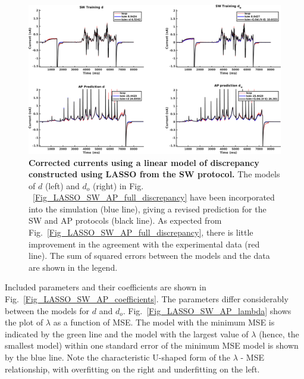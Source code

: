 \documentclass[11pt,a4paper,oneside]{article}
\begin{document}
\begin{figure}[hb]
\begin{center}
\includegraphics[scale=0.42]{Figures/LASSO_SW_AP_full_currents.png}
\caption{\textbf{Corrected currents using a linear model of discrepancy constructed using LASSO from the SW protocol.} The models of $d$ (left) and $d_o$ (right) in Fig. ~\ref{Fig_LASSO_SW_AP_full_discrepancy} have been incorporated into the simulation (blue line), giving a revised prediction for the SW and AP protocols (black line). As expected from Fig.~\ref{Fig_LASSO_SW_AP_full_discrepancy}, there is little improvement in the agreement with the experimental data (red line). The sum of squared errors between the models and the data are shown in the legend.}
\label{Fig_LASSO_SW_AP_full_currents}
\end{center}
\end{figure}

Included parameters and their coefficients are shown in Fig.~\ref{Fig_LASSO_SW_AP_coefficients}. The parameters differ considerably between the models for $d$ and $d_o$. Fig.~\ref{Fig_LASSO_SW_AP_lambda} shows the plot of $\lambda$ as a function of MSE. The model with the minimum MSE is indicated by the green line and the model with the largest value of $\lambda$ (hence, the smallest model) within one standard error of the minimum MSE model is shown by the blue line. Note the characteristic U-shaped form of the $\lambda$ - MSE relationship, with overfitting on the right and underfitting on the left.
\end{document}
